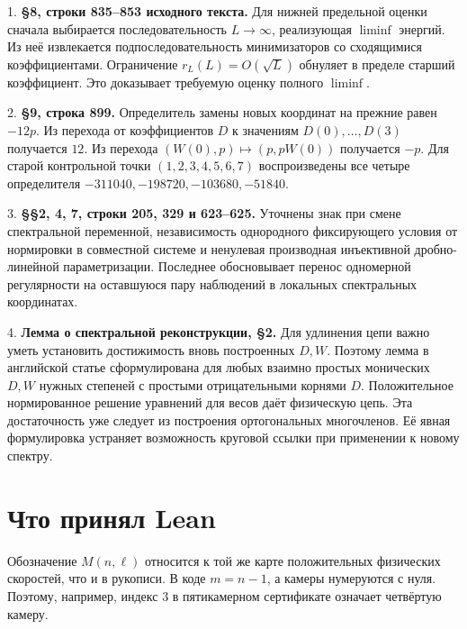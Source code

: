 \documentclass[12pt,a4paper]{article}
\begin{document}
1. \textbf{§8, строки 835–853 исходного текста.} Для нижней предельной оценки сначала выбирается последовательность \(L\to\infty\), реализующая \(\liminf\) энергий. Из неё извлекается подпоследовательность минимизаторов со сходящимися коэффициентами. Ограничение \(r_L(L)=O(\sqrt L)\) обнуляет в пределе старший коэффициент. Это доказывает требуемую оценку полного \(\liminf\).

2. \textbf{§9, строка 899.} Определитель замены новых координат на прежние равен \(-12p\). Из перехода от коэффициентов \(D\) к значениям \(D(0),\ldots,D(3)\) получается \(12\). Из перехода \((W(0),p)\mapsto(p,pW(0))\) получается \(-p\). Для старой контрольной точки \((1,2,3,4,5,6,7)\) воспроизведены все четыре определителя \(-311040,-198720,-103680,-51840\).

3. \textbf{§§2, 4, 7, строки 205, 329 и 623–625.} Уточнены знак при смене спектральной переменной, независимость однородного фиксирующего условия от нормировки в совместной системе и ненулевая производная инъективной дробно-линейной параметризации. Последнее обосновывает перенос одномерной регулярности на оставшуюся пару наблюдений в локальных спектральных координатах.

4. \textbf{Лемма о спектральной реконструкции, §2.} Для удлинения цепи важно уметь установить достижимость вновь построенных \(D,W\). Поэтому лемма в английской статье сформулирована для любых взаимно простых монических \(D,W\) нужных степеней с простыми отрицательными корнями \(D\). Положительное нормированное решение уравнений для весов даёт физическую цепь. Эта достаточность уже следует из построения ортогональных многочленов. Её явная формулировка устраняет возможность круговой ссылки при применении к новому спектру.

\section*{\color{ink} Что принял Lean}

Обозначение \(M(n,\ell)\) относится к той же карте положительных физических скоростей, что и в рукописи. В коде \(m=n-1\), а камеры нумеруются с нуля. Поэтому, например, индекс 3 в пятикамерном сертификате означает четвёртую камеру.
\end{document}
